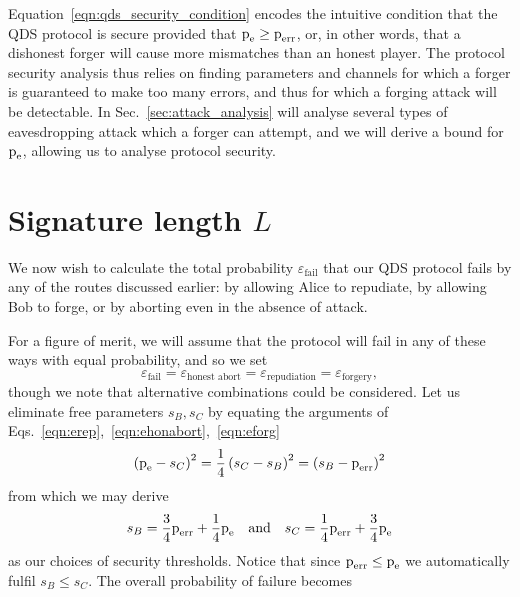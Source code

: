Equation~\ref{eqn:qds_security_condition} encodes the intuitive condition that the QDS protocol is secure provided that $\text{p}_{\text{e}} \ge \text{p}_{\text{err}}$, or, in other words, that a dishonest forger will cause more mismatches than an honest player. The protocol security analysis thus relies on finding parameters and channels for which a forger is guaranteed to make too many errors, and thus for which a forging attack will be detectable. In Sec.~\ref{sec:attack_analysis} will analyse several types of eavesdropping attack which a forger can attempt, and we will derive a bound for $\text{p}_{\text{e}}$, allowing us to analyse protocol security.


\section{Signature length $L$}

We now wish to calculate the total probability $\varepsilon_{\text{fail}}$ that our QDS protocol fails by any of the routes discussed earlier: by allowing Alice to repudiate, by allowing Bob to forge, or by aborting even in the absence of attack.

For a figure of merit, we will assume that the protocol will fail in any of these ways with equal probability, and so we set
\begin{equation}
\varepsilon_{\text{fail}} = \varepsilon_{\text{honest abort}} = \varepsilon_{\text{repudiation}} = \varepsilon_{\text{forgery}},
\end{equation}
though we note that alternative combinations could be considered. Let us eliminate free parameters $s_B, s_C$ by equating the arguments of Eqs.~\ref{eqn:erep},~\ref{eqn:ehonabort},~\ref{eqn:eforg}
\begin{equation}
\left(\text{p}_{\text{e}} - s_C\right)^2  = \frac{1}{4}\left(s_C - s_B\right)^2 = \left(s_B - \text{p}_{\text{err}}\right)^2
\end{equation}
from which we may derive
\begin{equation}
s_B = \frac{3}{4} \perr + \frac{1}{4}\pe \qq{and} s_C = \frac{1}{4}\perr + \frac{3}{4}\pe
\end{equation}
as our choices of security thresholds. Notice that since $\text{p}_{\text{err}} \le \text{p}_{\text{e}}$ we automatically fulfil $s_B \le s_C$. The overall probability of failure becomes

